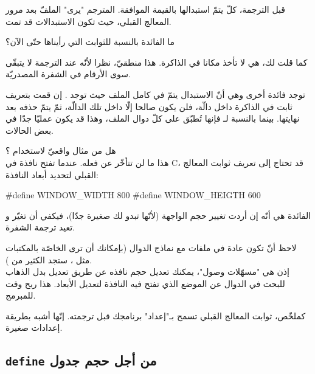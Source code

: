 \begin{Csource}
int main(int argc, char *argv[])
{
	int lives = 3;
  /* Code ... */
\end{Csource}

قبل الترجمة، كلّ
يتمّ استبدالها بالقيمة الموافقة. المترجم "يرى" الملفّ بعد مرور المعالج القبلي، حيث تكون الاستبدالات قد تمت.

\begin{question}
ما الفائدة بالنسبة للثوابت التي رأيناها حتّى الآن؟
\end{question}

كما قلت لك، هي لا تأخذ مكانا في الذاكرة. هذا منطقيّ، نظرا لأنّه عند الترجمة لا يتبقّى سوى الأرقام في الشفرة المصدريّة.

توجد فائدة أخرى وهي أنّ الاستبدال يتمّ في كامل الملف حيث توجد
.
إن قمت بتعريف ثابت في الذاكرة داخل دالّة، فلن يكون صالحا إلّا داخل تلك الدالّة، ثمّ يتمّ حذفه بعد نهايتها.
بينما بالنسبة لـ
فإنها تُطبّق على كلّ دوال الملف، وهذا قد يكون عمليّا جدّا في بعض الحالات.

هل من مثال واقعيّ لاستخدام
؟\\
هذا ما لن تتأخّر عن فعله. عندما تفتح نافذة في
\textenglish{C}، قد تحتاج إلى تعريف ثوابت المعالج القبلي لتحديد أبعاد النافذة:

\begin{Csource}
#define WINDOW_WIDTH 800
#define WINDOW_HEIGTH 600
\end{Csource}

الفائدة هي أنّه إن أردت تغيير حجم الواجهة (لأنّها تبدو لك صغيرة جدّا)، فيكفي أن تغيّر
و تعيد ترجمة الشفرة.

لاحظ أنّ
تكون عادة في ملفات
مع نماذج الدوال (بإمكانك أن ترى
الخاصّة بالمكتبات مثل
،
ستجد الكثير من
).\\
إذن هي "مسهّلات وصول"، يمكنك تعديل حجم نافذه عن طريق تعديل
بدل الذهاب للبحث في الدوال عن الموضع الذي تفتح فيه النافذة لتعديل الأبعاد. هذا ربح وقت للمبرمج.

كملخّص، ثوابت المعالج القبلي تسمح بـ"إعداد" برنامجك قبل ترجمته. إنّها أشبه بطريقة إعدادات صغيرة.

\subsection{\texttt{define} من أجل حجم جدول}

